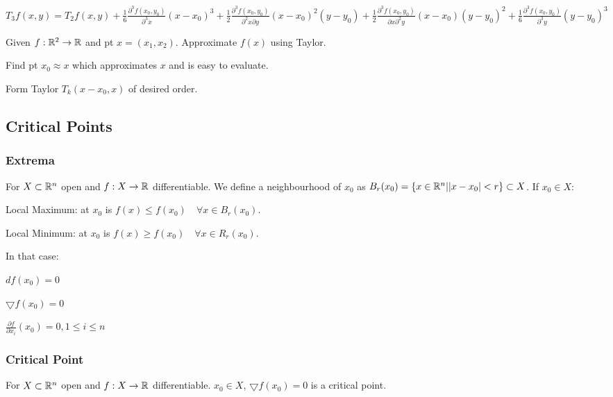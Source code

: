 $T_3 f(x, y) = T_2 f(x, y) + \frac{1}{6} \frac{\partial^3 f(x_0, y_0)}{\partial^3 x} (x - x_0)^3 + \frac{1}{2} \frac{\partial^3 f(x_0, y_0)}{\partial^2 x \partial y} (x - x_0)^2 (y - y_0) + \frac{1}{2} \frac{\partial^3 f(x_0, y_0)}{\partial x \partial^2 y} (x - x_0) (y - y_0)^2 + \frac{1}{6} \frac{\partial^3 f(x_0, y_0)}{\partial^3 y} (y - y_0)^3$

Given $f: \mathbb{R}^2 \to \mathbb{R}$ and pt $x = (x_1, x_2)$. Approximate $f(x)$ using Taylor.

\begin{compactitem}
    \item Find pt $x_0 \approx x$ which approximates $x$ and is easy to evaluate.
    \item Form Taylor $T_k(x - x_0, x)$ of desired order.
\end{compactitem}

\subsection{Critical Points}
\subsubsection{Extrema}
For $X \subset \mathbb{R}^n$ open and $f: X \to \mathbb{R}$ differentiable. We define a neighbourhood of $x_0$ as $B_r(x_0) = \{x \in \mathbb{R}^n | |x - x_0| < r\} \subset X$. If $x_0 \in X$:

\begin{compactdesc}
    \item[Local Maximum:] at $x_0$ is $f(x) \le f(x_0) \quad \forall x \in B_r(x_0)$.
    \item[Local Minimum:] at $x_0$ is $f(x) \ge f(x_0) \quad \forall x \in R_r(x_0)$.
\end{compactdesc}

In that case:
\begin{inparaitem}
    \item  $df(x_0) = 0$
    \item $\bigtriangledown f(x_0) = 0$
    \item $\frac{\partial f}{\partial x_i}(x_0) = 0, 1 \le i \le n$
\end{inparaitem}

\subsubsection{Critical Point}
For $X \subset \mathbb{R}^n$ open and $f: X \to \mathbb{R}$ differentiable. $x_0 \in X$, $\bigtriangledown f(x_0) = 0$ is a critical point.

